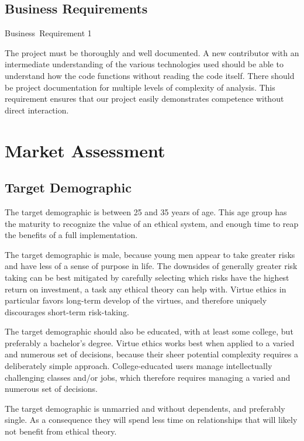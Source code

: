 \documentclass{article}
\newcommand{\requirementname}{Undefined}
\newcommand{\requirementlabel}{undefined}
\newcommand{\setreqtype}[2]
    {
        \renewcommand{\requirementname}{#1}
        \renewcommand{\requirementlabel}{#2}
    }
\newenvironment{requirement}[1]
    {
        \begin{mdframed}
        \label{\requirementlabel-#1}
        \vspace{2.5mm}
        \begin{center}
            {\large \requirementname\ Requirement #1}
        \end{center}
        \vspace{2.5mm}
    }
    {
        \end{mdframed}
    }
\begin{document}
\subsection{Business Requirements}
\setreqtype{Business}{business}

\begin{requirement}{1}
    The project must be thoroughly and well documented.
    A new contributor with an intermediate understanding of the various technologies used should be able to understand how the code functions without reading the code itself.
    There should be project documentation for multiple levels of complexity of analysis.
    This requirement ensures that our project easily demonstrates competence without direct interaction.
\end{requirement}

\section{Market Assessment}

\subsection{Target Demographic}

The target demographic is between 25 and 35 years of age.
This age group has the maturity to recognize the value of an ethical system, and enough time to reap the benefits of a full implementation.

The target demographic is male, because young men appear to take greater risks and have less of a sense of purpose in life.
The downsides of generally greater risk taking can be best mitigated by carefully selecting which risks have the highest return on investment, a task any ethical theory can help with.
Virtue ethics in particular favors long-term develop of the virtues, and therefore uniquely discourages short-term risk-taking.

The target demographic should also be educated, with at least some college, but preferably a bachelor's degree.
Virtue ethics works best when applied to a varied and numerous set of decisions, because their sheer potential complexity requires a deliberately simple approach.
College-educated users manage intellectually challenging classes and/or jobs, which therefore requires managing a varied and numerous set of decisions.

The target demographic is unmarried and without dependents, and preferably single.
As a consequence they will spend less time on relationships that will likely not benefit from ethical theory.
\end{document}
